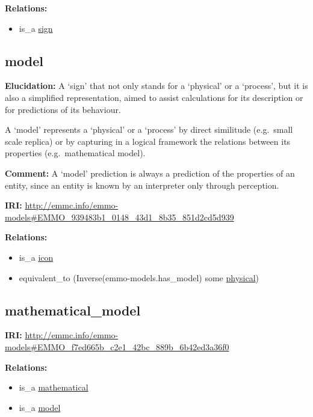 \documentclass[a4paper,]{report}
\providecommand{\tightlist}{%
  \setlength{\itemsep}{0pt}\setlength{\parskip}{0pt}}
\begin{document}
\textbf{Relations:}

\begin{itemize}
\tightlist
\item
  is\_a \protect\hyperlink{sign}{sign}
\end{itemize}

\hypertarget{model}{%
\subsection{model}\label{model}}

\textbf{Elucidation:} A `sign' that not only stands for a `physical' or
a `process', but it is also a simplified representation, aimed to assist
calculations for its description or for predictions of its behaviour.

A `model' represents a `physical' or a `process' by direct similitude
(e.g.~small scale replica) or by capturing in a logical framework the
relations between its properties (e.g.~mathematical model).

\textbf{Comment:} A `model' prediction is always a prediction of the
properties of an entity, since an entity is known by an interpreter only
through perception.

\textbf{IRI:}
\url{http://emmc.info/emmo-models\#EMMO_939483b1_0148_43d1_8b35_851d2cd5d939}

\textbf{Relations:}

\begin{itemize}
\tightlist
\item
  is\_a \protect\hyperlink{icon}{icon}
\item
  equivalent\_to (Inverse(emmo-models.has\_model) some
  \protect\hyperlink{physical}{physical})
\end{itemize}

\hypertarget{mathematical_model}{%
\subsection{mathematical\_model}\label{mathematical_model}}

\textbf{IRI:}
\url{http://emmc.info/emmo-models\#EMMO_f7ed665b_c2e1_42bc_889b_6b42ed3a36f0}

\textbf{Relations:}

\begin{itemize}
\tightlist
\item
  is\_a \protect\hyperlink{mathematical}{mathematical}
\item
  is\_a \protect\hyperlink{model}{model}
\end{itemize}
\end{document}
